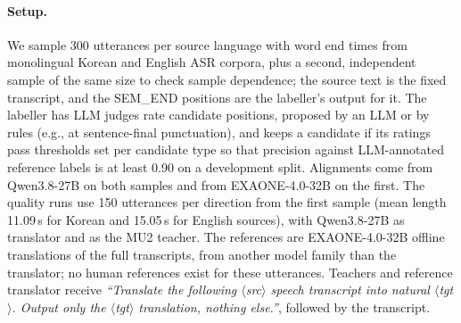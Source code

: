 \paragraph{Setup.}
We sample 300 utterances per source language with word end times from monolingual Korean and English ASR corpora, plus a second, independent sample of the same size to check sample dependence; the source text is the fixed transcript, and the SEM\_END positions are the labeller's output for it. The labeller has LLM judges rate candidate positions, proposed by an LLM or by rules (e.g., at sentence-final punctuation), and keeps a candidate if its ratings pass thresholds set per candidate type so that precision against LLM-annotated reference labels is at least 0.90 on a development split. Alignments come from Qwen3.8-27B on both samples and from EXAONE-4.0-32B on the first. The quality runs use 150 utterances per direction from the first sample (mean length 11.09\,s for Korean and 15.05\,s for English sources), with Qwen3.8-27B as translator and as the MU2 teacher. The references are EXAONE-4.0-32B offline translations of the full transcripts, from another model family than the translator; no human references exist for these utterances. Teachers and reference translator receive \textit{``Translate the following $\langle$src$\rangle$ speech transcript into natural $\langle$tgt$\rangle$. Output only the $\langle$tgt$\rangle$ translation, nothing else.''}, followed by the transcript.

